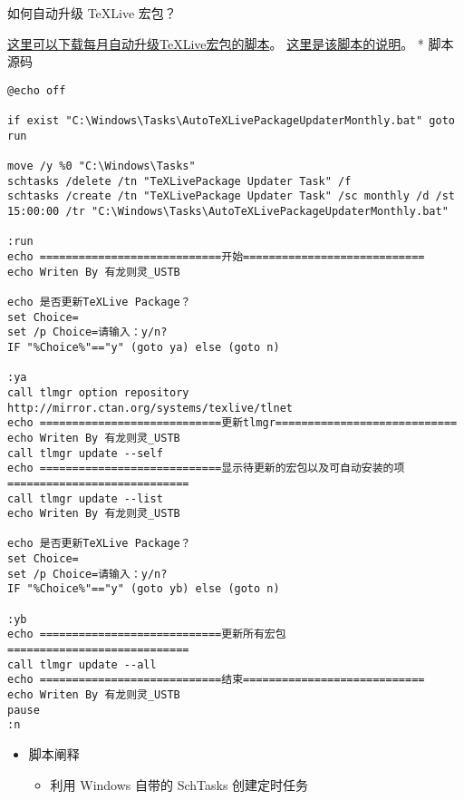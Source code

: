\begin{faq}{如何自动升级 TeXLive 宏包？}

\href{http://pd10ibe5c.bkt.clouddn.com/TeXLive\%E5\%AE\%8F\%E5\%8C\%85\%E6\%AF\%8F\%E6\%9C\%88\%E8\%87\%AA\%E5\%8A\%A8\%E6\%9B\%B4\%E6\%96\%B0.zip}{这}\href{http://pd10ibe5c.bkt.clouddn.com/TeXLive\%E5\%AE\%8F\%E5\%8C\%85\%E6\%AF\%8F\%E6\%9C\%88\%E8\%87\%AA\%E5\%8A\%A8\%E6\%9B\%B4\%E6\%96\%B0.zip}{里可以下载每月自动升级TeXLive宏包的脚本}。
\href{http://htharoldht.com/texlive-package-automatically-upgrades-every-month/}{这里是该脚本的说明}。
* 脚本源码

\begin{verbatim}
@echo off

if exist "C:\Windows\Tasks\AutoTeXLivePackageUpdaterMonthly.bat" goto run

move /y %0 "C:\Windows\Tasks"
schtasks /delete /tn "TeXLivePackage Updater Task" /f
schtasks /create /tn "TeXLivePackage Updater Task" /sc monthly /d /st 15:00:00 /tr "C:\Windows\Tasks\AutoTeXLivePackageUpdaterMonthly.bat"

:run
echo ============================开始============================
echo Writen By 有龙则灵_USTB

echo 是否更新TeXLive Package？
set Choice=
set /p Choice=请输入：y/n?
IF "%Choice%"=="y" (goto ya) else (goto n)

:ya
call tlmgr option repository http://mirror.ctan.org/systems/texlive/tlnet
echo ============================更新tlmgr============================
echo Writen By 有龙则灵_USTB
call tlmgr update --self
echo ============================显示待更新的宏包以及可自动安装的项============================
call tlmgr update --list
echo Writen By 有龙则灵_USTB

echo 是否更新TeXLive Package？
set Choice=
set /p Choice=请输入：y/n?
IF "%Choice%"=="y" (goto yb) else (goto n)

:yb
echo ============================更新所有宏包============================
call tlmgr update --all
echo ============================结束============================
echo Writen By 有龙则灵_USTB
pause
:n
\end{verbatim}

\begin{itemize}

\item
  脚本阐释

  \begin{itemize}

  \item
    利用 Windows 自带的 SchTasks 创建定时任务
  \end{itemize}
\end{itemize}


\end{faq}
